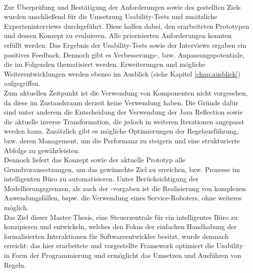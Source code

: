     \\
    \linebreak
    Zur Überprüfung und Bestätigung der Anforderungen sowie des gestellten Ziels wurden anschließend für die Umsetzung Usability-Tests und zusätzliche 
    Experteninterviews durchgeführt. Diese halfen dabei, den erarbeiteten Prototypen und dessen Konzept zu evaluieren. Alle priorisierten 
    Anforderungen konnten erfüllt werden. Das Ergebnis der Usability-Tests sowie der Interviews ergaben ein positives Feedback. Dennoch 
    gibt es Verbesserungs-, bzw. Anpassungspotentiale, die im Folgenden thematisiert werden. Erweiterungen und mögliche Weiterentwicklungen werden 
    ebenso im Ausblick (siehe Kapitel \ref{chap:ausblick}) aufgegriffen. 
    \\
    \linebreak 
    Zum aktuellen Zeitpunkt ist die Verwendung von Komponenten nicht vorgesehen, da diese im Zustandsraum derzeit keine Verwendung haben. Die 
    Gründe dafür sind unter anderem die Entscheidung der Verwendung der Java Reflection sowie die aktuelle inverse Transformation, die jedoch in weiteren 
    Iterationen angepasst werden kann. Zusätzlich gibt es mögliche Optimierungen der Regelausführung, bzw. deren Management, um die Performanz 
    zu steigern und eine strukturierte Abfolge zu gewährleisten.  
    \\
    Dennoch liefert das Konzept sowie der aktuelle Prototyp alle Grundvoraussetzungen, um das gewünschte Ziel zu 
    erreichen, bzw. Prozesse im intelligenten Büro zu automatisieren. Unter Berücksichtigung der Modellierungsgrenzen, als 
    auch der -vorgaben ist die Realisierung von komplexen Anwendungsfällen, bspw. die Verwendung eines 
    Service-Roboters, ohne weiteres möglich. 
    \\
    \linebreak
    Das Ziel dieser Master-Thesis, eine Steuerzentrale für ein intelligentes Büro zu konzipieren und entwickeln, welches den Fokus der 
    einfachen Handhabung der formalisierten Interaktionen für Softwareentwickler besitzt, wurde demnach erreicht: das hier erarbeitete 
    und vorgestellte Framework optimiert die Usability in Form der Programmierung und ermöglicht das Umsetzen und Ausführen von Regeln. 
